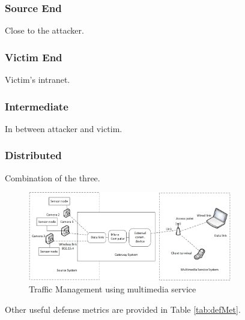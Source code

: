 \documentclass[conference]{IEEEtran}
\begin{document}
\subsubsection{Source End}
Close to the attacker.
\subsubsection{Victim End}
Victim's intranet.
\subsubsection{Intermediate}
In between attacker and victim.
\subsubsection{Distributed}
Combination of the three.

\begin{figure}[!ht]
\centering
\includegraphics[width=3.5in]{traffic}
\caption{Traffic Management using multimedia service}
\label{traffic.png}
\end{figure}

\noindent Other useful defense metrics are provided in Table \ref{tab:defMet}. 
\end{document}
